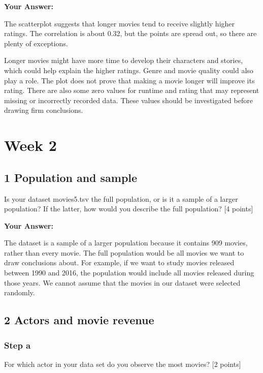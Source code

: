 \documentclass[
]{article}
\begin{document}
\textbf{Your Answer:}

The scatterplot suggests that longer movies tend to receive slightly
higher ratings. The correlation is about 0.32, but the points are spread
out, so there are plenty of exceptions.

Longer movies might have more time to develop their characters and
stories, which could help explain the higher ratings. Genre and movie
quality could also play a role. The plot does not prove that making a
movie longer will improve its rating. There are also some zero values
for runtime and rating that may represent missing or incorrectly
recorded data. These values should be investigated before drawing firm
conclusions.

\newpage

\section{Week 2}\label{week-2}

\subsection{1 Population and sample}\label{population-and-sample}

Is your dataset movies5.tsv the full population, or is it a sample of a
larger population? If the latter, how would you describe the full
population? {[}4 points{]}

\textbf{Your Answer:}

The dataset is a sample of a larger population because it contains 909
movies, rather than every movie. The full population would be all movies
we want to draw conclusions about. For example, if we want to study
movies released between 1990 and 2016, the population would include all
movies released during those years. We cannot assume that the movies in
our dataset were selected randomly.

\subsection{2 Actors and movie revenue}\label{actors-and-movie-revenue}

\subsubsection{Step a}\label{step-a-1}

For which actor in your data set do you observe the most movies? {[}2
points{]}
\end{document}
